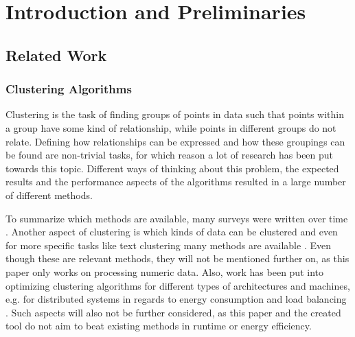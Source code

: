 \documentclass[
	a4paper,
	english,
	twoside,
	openright,               
	11pt                            
	]{report}
\begin{document}




\tableofcontents
 \cleardoublepage
%
%
\listoffigures
\cleardoublepage



 \part{Introduction and Preliminaries}
   \setcounter{page}{1}
 


\chapter{Related Work}\label{cha:related_work}
\section{Clustering Algorithms}

Clustering is the task of finding groups of points in data such that points within a group have some kind of relationship, while points in different groups do not relate. Defining how relationships can be expressed and how these groupings can be found are non-trivial tasks, for which reason a lot of research has been put towards this topic. Different ways of thinking about this problem, the expected results and the performance aspects of the algorithms resulted in a large number of different methods. 

 To summarize which methods are available, many surveys were written over time \cite{7154919,1427769,7414675,surveyclustering}. Another aspect of clustering is which kinds of data can be clustered and even for more specific tasks like text clustering many methods are available \cite{5982288}. Even though these are relevant methods, they will not be mentioned further on, as this paper only works on processing numeric data. Also, work has been put into optimizing clustering algorithms for different types of architectures and machines, e.g. for distributed systems \cite{6322592} in regards to energy consumption and load balancing \cite{7586361}. Such aspects will also not be further considered, as this paper and the created tool do not aim to beat existing methods in runtime or energy efficiency.
\end{document}
